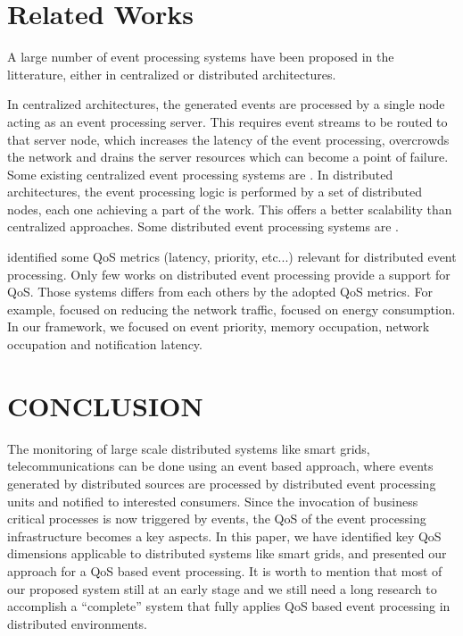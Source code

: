 \documentclass[a4paper,twoside]{article}
\begin{document}
\section{Related Works}
\label{sec:relatedworks}
A large number of event processing systems have been proposed in the litterature, either in centralized or distributed architectures. 

In centralized architectures, the generated events are processed by a single node acting as an event processing server. This requires event streams to be routed to that server node, which increases the latency of the event processing, overcrowds the network and drains the server resources which can become a point of failure. Some existing centralized event processing systems are \cite{Esper,Gyllstrom2006,Demers2007,Luckham1996}.
In distributed architectures, the event processing logic is performed by a set of distributed nodes, each one achieving a part of the work. This offers a better scalability than centralized approaches. Some distributed event processing systems are \cite{Cugola2009,Saleh2013,Pietzuch2003,Streambase,Oracle}.

\cite{Behnel2006} identified some QoS metrics (latency, priority, etc...) relevant for distributed event processing. Only few works on distributed event processing provide a support for QoS. Those systems differs from each others by the adopted QoS metrics. For example, \cite{Cugola2009} focused on reducing the network traffic, \cite{Saleh2013} focused on energy consumption. In our framework, we focused on event priority, memory occupation, network occupation and notification latency. 

\section{\uppercase{Conclusion}}
\label{sec:conclusion}
The monitoring of large scale distributed systems like smart grids, telecommunications can be done using an event based approach, where events generated by distributed sources are processed by distributed  event processing units and notified to interested consumers. Since the invocation of business critical processes is now triggered by events, the QoS of the event processing infrastructure becomes a key aspects. In this paper, we have identified key QoS dimensions applicable to distributed systems like smart grids, and presented our approach for a QoS based event processing. It is worth to mention that most of our proposed system still at an early stage and we still need a long research to accomplish a “complete” system that fully applies QoS based event processing in distributed environments. 


{\small
}

\vfill
\end{document}
